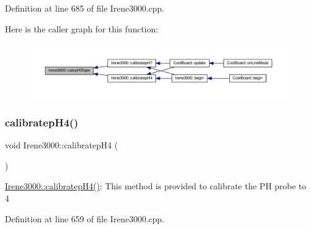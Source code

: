 Definition at line 685 of file Irene3000.\+cpp.

Here is the caller graph for this function\+:\nopagebreak
\begin{figure}[H]
\begin{center}
\leavevmode
\includegraphics[width=350pt]{class_irene3000_a81f6a79e546679692053f7ac1af49613_icgraph}
\end{center}
\end{figure}
\mbox{\label{class_irene3000_aa140dd026922a04981edfd04d46cabbe}} 
\subsubsection{\texorpdfstring{calibratep\+H4()}{calibratepH4()}}
{\footnotesize\ttfamily void Irene3000\+::calibratep\+H4 (\begin{DoxyParamCaption}{ }\end{DoxyParamCaption})}

\hyperlink{class_irene3000_aa140dd026922a04981edfd04d46cabbe}{Irene3000\+::calibratep\+H4()}\+: This method is provided to calibrate the PH probe to 4 

Definition at line 659 of file Irene3000.\+cpp.

